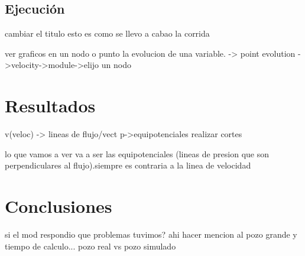 \documentclass[10pt,a4paper,final]{article}
\begin{document}
\subsection{Ejecución}
cambiar el titulo esto es como se llevo a cabao la corrida

ver graficos en un nodo o punto la evolucion de una variable. -> point evolution ->velocity->module->elijo un nodo
\section{Resultados}
v(veloc) -> lineas de flujo/vect
p->equipotenciales
realizar cortes

lo que vamos a ver va a ser las equipotenciales (lineas de presion que son perpendiculares al flujo).siempre es contraria a la linea de velocidad
\section{Conclusiones}
si el mod respondio
que problemas tuvimos? ahi hacer mencion al pozo grande y tiempo de calculo...
pozo real vs pozo simulado
\end{document}
